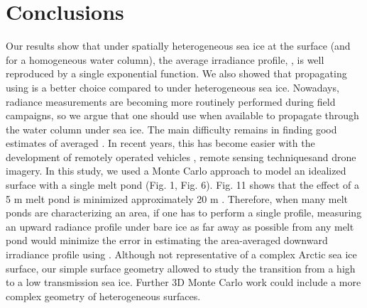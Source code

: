 \section{Conclusions}

Our results show that under spatially heterogeneous sea ice at the surface (and for a homogeneous water column), the average irradiance profile, \meanedz{}, is well reproduced by a single exponential function. We also showed that propagating \edzero{} using \klu{} is a better choice compared to \ked{} under heterogeneous sea ice. Nowadays, radiance measurements are becoming more routinely performed during field campaigns, so we argue that one should use \klu{} when available to propagate \edzero{} through the water column under sea ice. The main difficulty remains in finding good estimates of averaged \edzero{}. In recent years, this has become easier with the development of remotely operated vehicles \citep{Katlein2015, Arndt2017, Nicolaus2013}, remote sensing techniques\DIFaddbegin \DIFadd{, }\DIFaddend and drone imagery. In this study, we used a Monte Carlo approach to model an idealized surface with a single melt pond (Fig. 1, Fig. 6). Fig. 11 shows that the effect of a 5 m melt pond is minimized \DIFdelbegin {}\DIFdelend \DIFaddbegin {}\DIFaddend approximately 20 m \DIFaddbegin {}\DIFaddend . Therefore, when many melt ponds are characterizing an area, if one has to perform a single profile, measuring an upward radiance profile under bare ice as far away as possible from any melt pond would minimize the error in estimating the area-averaged downward irradiance profile using \klu{}. Although not representative of a complex Arctic sea ice surface, our simple surface geometry allowed to study the transition from a high to a low transmission sea ice. Further 3D Monte Carlo work could include a more complex geometry of heterogeneous surfaces.